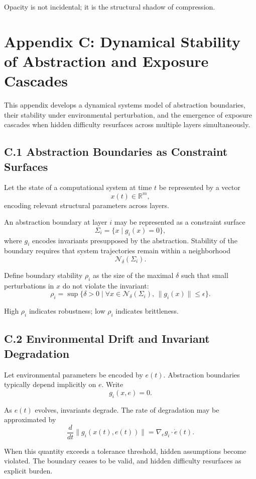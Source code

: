 \documentclass[11pt]{article}
\begin{document}
Opacity is not incidental; it is the structural shadow of compression.

\section{Appendix C: Dynamical Stability of Abstraction and Exposure Cascades}

This appendix develops a dynamical systems model of abstraction boundaries, their stability under environmental perturbation, and the emergence of exposure cascades when hidden difficulty resurfaces across multiple layers simultaneously.

\subsection{C.1 Abstraction Boundaries as Constraint Surfaces}

Let the state of a computational system at time $t$ be represented by a vector
\[
x(t) \in \mathbb{R}^m,
\]
encoding relevant structural parameters across layers.

An abstraction boundary at layer $i$ may be represented as a constraint surface
\[
\Sigma_i = \{ x \mid g_i(x) = 0 \},
\]
where $g_i$ encodes invariants presupposed by the abstraction. Stability of the boundary requires that system trajectories remain within a neighborhood
\[
\mathcal{N}_\delta(\Sigma_i).
\]

Define boundary stability $\rho_i$ as the size of the maximal $\delta$ such that small perturbations in $x$ do not violate the invariant:
\[
\rho_i = \sup \{ \delta > 0 \mid \forall x \in \mathcal{N}_\delta(\Sigma_i), \, \|g_i(x)\| \leq \epsilon \}.
\]

High $\rho_i$ indicates robustness; low $\rho_i$ indicates brittleness.

\subsection{C.2 Environmental Drift and Invariant Degradation}

Let environmental parameters be encoded by $e(t)$. Abstraction boundaries typically depend implicitly on $e$. Write
\[
g_i(x, e) = 0.
\]

As $e(t)$ evolves, invariants degrade. The rate of degradation may be approximated by
\[
\frac{d}{dt} \| g_i(x(t), e(t)) \| = \nabla_e g_i \cdot \dot{e}(t).
\]

When this quantity exceeds a tolerance threshold, hidden assumptions become violated. The boundary ceases to be valid, and hidden difficulty resurfaces as explicit burden.
\end{document}
